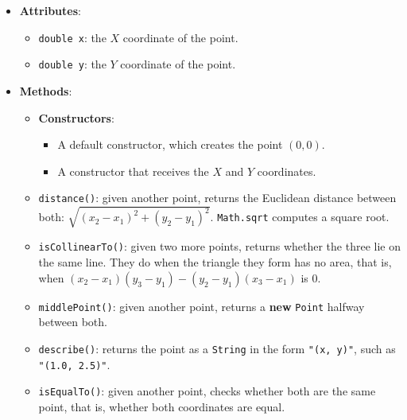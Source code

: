 \begin{itemize}

    \item \textbf{Attributes}:

        \begin{itemize}

            \item \texttt{double x}: the \(X\) coordinate of the point.

            \item \texttt{double y}: the \(Y\) coordinate of the point.

        \end{itemize}

    \item \textbf{Methods}:

        \begin{itemize}

            \item \textbf{Constructors}:

                \begin{itemize}

                    \item A default constructor, which creates the point \((0, 0)\).

                    \item A constructor that receives the \(X\) and \(Y\) coordinates.

                \end{itemize}

            \item \texttt{distance()}: given another point, returns the Euclidean distance between both: \(\sqrt{(x_2 - x_1)^2 + (y_2 - y_1)^2}\). \texttt{Math.sqrt} computes a square root.

            \item \texttt{isCollinearTo()}: given two more points, returns whether the three lie on the same line. They do when the triangle they form has no area, that is, when \((x_2 - x_1)(y_3 - y_1) - (y_2 - y_1)(x_3 - x_1)\) is \(0\).

            \item \texttt{middlePoint()}: given another point, returns a \textbf{new} \texttt{Point} halfway between both.

            \item \texttt{describe()}: returns the point as a \texttt{String} in the form \texttt{"(x, y)"}, such as \texttt{"(1.0, 2.5)"}.

            \item \texttt{isEqualTo()}: given another point, checks whether both are the same point, that is, whether both coordinates are equal.

        \end{itemize}

\end{itemize}


